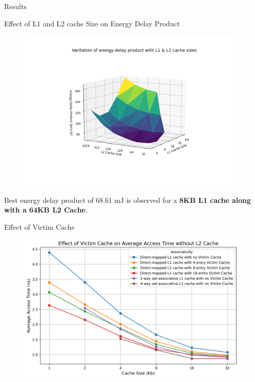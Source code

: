 \begin{section}{Results}
\begin{subsection}{Effect of L1 and L2 cache Size on Energy Delay Product}
        \begin{figure}[h]
            \includegraphics[width=\textwidth]{figures/fig6/fig6.png}
            \centering
            \label{fig:fig6}
        \end{figure}
    
        Best energy delay product of 68.61 mJ is observed for a \textbf{8KB L1 cache along with a 64KB L2 Cache}.
        
    \end{subsection}
    \newpage
    \begin{subsection}{Effect of Victim Cache}


        \begin{figure}[h]
            \includegraphics[width=\textwidth]{figures/fig7/fig7.png}
            \centering
            \label{fig:fig7}
        \end{figure}
        
    \end{subsection}

\end{section}